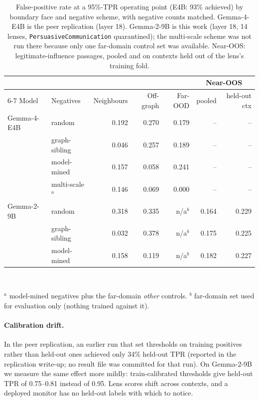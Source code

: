 \documentclass[11pt]{article}
\begin{document}
\begin{table}[t]
  \centering
  \small
  \caption{False-positive rate at a 95\%-TPR operating point (E4B: 93\% achieved) by boundary face and negative
  scheme, with negative counts matched. Gemma-4-E4B is the peer replication (layer 18). Gemma-2-9B is this work
  (layer 18, 14 lenses, \texttt{PersuasiveCommunication} quarantined); the multi-scale scheme was not run there
  because only one far-domain control set was available. Near-OOS: legitimate-influence passages, pooled and on
  contexts held out of the lens's training fold.}
  \label{tab:faces}
  \setlength{\tabcolsep}{5pt}
  \begin{tabular}{llrrrrr}
    \toprule
    & & & & & \multicolumn{2}{c}{Near-OOS} \\
    \cmidrule(lr){6-7}
    Model & Negatives & Neighbours & Off-graph & Far-OOD & pooled & held-out ctx \\
    \midrule
    Gemma-4-E4B & random        & 0.192 & 0.270 & 0.179 & -- & -- \\
                & graph-sibling & 0.046 & 0.257 & 0.189 & -- & -- \\
                & model-mined   & 0.157 & 0.058 & 0.241 & -- & -- \\
                & multi-scale$^{a}$ & 0.146 & 0.069 & 0.000 & -- & -- \\
    \midrule
    Gemma-2-9B  & random        & 0.318 & 0.335 & n/a$^{b}$ & 0.164 & 0.229 \\
                & graph-sibling & 0.032 & 0.378 & n/a$^{b}$ & 0.175 & 0.225 \\
                & model-mined   & 0.158 & 0.119 & n/a$^{b}$ & 0.182 & 0.227 \\
    \bottomrule
  \end{tabular}\\[3pt]
  \parbox{\linewidth}{\raggedright\footnotesize $^{a}$ model-mined negatives plus the far-domain \emph{other} controls.
  $^{b}$ far-domain set used for evaluation only (nothing trained against it).}
\end{table}

\paragraph{Calibration drift.} In the peer replication, an earlier run that set thresholds on training positives
rather than held-out ones achieved only 34\% held-out TPR (reported in the replication write-up; no result file
was committed for that run). On Gemma-2-9B we measure the same effect more mildly: train-calibrated thresholds
give held-out TPR of 0.75--0.81 instead of 0.95. Lens scores shift across contexts, and a deployed monitor has no
held-out labels with which to notice.
\end{document}
